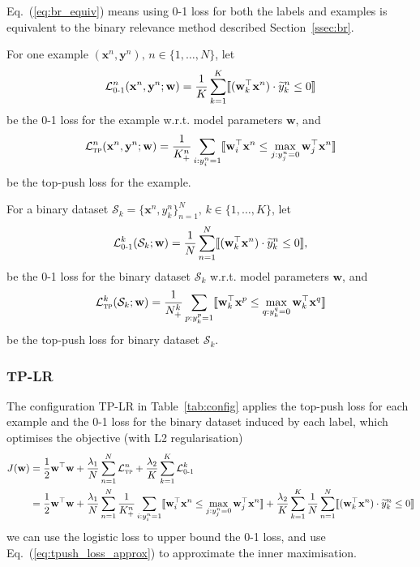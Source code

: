 \documentclass[9pt]{extarticle}
\newcommand{\llb}{\llbracket}
\newcommand{\rrb}{\rrbracket}
\newcommand{\x}{\mathbf{x}}
\newcommand{\y}{\mathbf{y}}
\newcommand{\1}{\mathbf{1}}
\newcommand{\w}{\mathbf{w}}
\newcommand{\LCal}{\mathcal{L}}
\newcommand{\SCal}{\mathcal{S}}
\begin{document}
Eq.~(\ref{eq:br_equiv}) means using 0-1 loss for both the labels and examples is equivalent to 
the binary relevance method described Section~\ref{ssec:br}.

For one example $(\x^n, \y^n), \, n \in \{1,\dots,N\}$, let
\begin{equation}
\label{eq:log_loss_example}
\LCal_\textsc{0-1}^n(\x^n, \y^n; \w) = \frac{1}{K} \sum_{k=1}^K \llb (\w_k^\top \x^n) \cdot \widetilde{y}_k^n \le 0 \rrb 
\end{equation}
be the 0-1 loss for the example w.r.t. model parameters $\w$, and
\begin{equation}
\label{eq:tp_loss_example}
\LCal_\textsc{tp}^n(\x^n, \y^n; \w) = \frac{1}{K_+^n} \sum_{i: y_i^n=1} \llb \w_i^\top \x^n \le \max_{j: y_j^n=0} \w_j^\top \x^n \rrb
\end{equation}
be the top-push loss for the example. 

For a binary dataset $\SCal_k = \{\x^n, y_k^n\}_{n=1}^N, \, k \in \{1,\dots,K\}$, let
\begin{equation}
\label{eq:log_loss_label}
\LCal_\textsc{0-1}^k(\SCal_k; \w) = \frac{1}{N} \sum_{n=1}^N \llb (\w_k^\top \x^n) \cdot \widetilde{y}_k^n \le 0 \rrb,
\end{equation}
be the 0-1 loss for the binary dataset $\SCal_k$ w.r.t. model parameters $\w$, and
\begin{equation}
\label{eq:tp_loss_label}
\LCal_\textsc{tp}^k(\SCal_k; \w) = \frac{1}{N_+^k} \sum_{p: y_k^p=1} \llb \w_k^\top \x^p \le \max_{q: y_k^q=0} \w_k^\top \x^q \rrb
\end{equation}
be the top-push loss for binary dataset $\SCal_k$.


\subsubsection{TP-LR}
\label{sssec:tp_lr}

The configuration TP-LR in Table~\ref{tab:config} applies the top-push loss for each example and 
the 0-1 loss for the binary dataset induced by each label, which optimises the objective (with L2 regularisation)
\begin{equation}
\label{eq:tp_lr_obj}
\begin{aligned}
J(\w)
&= \frac{1}{2} \w^\top \w +
   \frac{\lambda_1}{N} \sum_{n=1}^N \LCal_\textsc{tp}^n +
   \frac{\lambda_2}{K} \sum_{k=1}^K \LCal_\textsc{0-1}^k \\
&= \frac{1}{2} \w^\top \w +
   \frac{\lambda_1}{N} \sum_{n=1}^N \frac{1}{K_+^n} \sum_{i: y_i^n=1} \llb \w_i^\top \x^n \le \max_{j: y_j^n=0} \w_j^\top \x^n \rrb +
   \frac{\lambda_2}{K} \sum_{k=1}^K \frac{1}{N} \sum_{n=1}^N \llb (\w_k^\top \x^n) \cdot \widetilde{y}_k^n \le 0 \rrb %
\end{aligned}
\end{equation}
we can use the logistic loss to upper bound the 0-1 loss, and use Eq.~(\ref{eq:tpush_loss_approx}) to approximate the inner maximisation.
\end{document}
